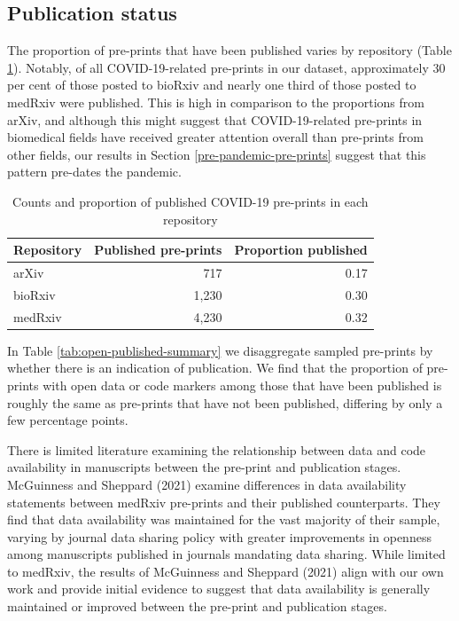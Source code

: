 \documentclass[
]{article}
\begin{document}
\hypertarget{publication-status}{%
\subsection{Publication status}\label{publication-status}}

The proportion of pre-prints that have been published varies by repository (Table \ref{tab:published-sample-summary}). Notably, of all COVID-19-related pre-prints in our dataset, approximately 30 per cent of those posted to bioRxiv and nearly one third of those posted to medRxiv were published. This is high in comparison to the proportions from arXiv, and although this might suggest that COVID-19-related pre-prints in biomedical fields have received greater attention overall than pre-prints from other fields, our results in Section \ref{pre-pandemic-pre-prints} suggest that this pattern pre-dates the pandemic.

\begin{table}

\caption{\label{tab:published-sample-summary}Counts and proportion of published COVID-19 pre-prints in each repository}
\centering
\begin{tabular}[t]{l|r|r}
\hline
Repository & Published pre-prints & Proportion published\\
\hline
arXiv & 717 & 0.17\\
\hline
bioRxiv & 1,230 & 0.30\\
\hline
medRxiv & 4,230 & 0.32\\
\hline
\end{tabular}
\end{table}

In Table \ref{tab:open-published-summary} we disaggregate sampled pre-prints by whether there is an indication of publication. We find that the proportion of pre-prints with open data or code markers among those that have been published is roughly the same as pre-prints that have not been published, differing by only a few percentage points.

There is limited literature examining the relationship between data and code availability in manuscripts between the pre-print and publication stages. McGuinness and Sheppard (2021) examine differences in data availability statements between medRxiv pre-prints and their published counterparts. They find that data availability was maintained for the vast majority of their sample, varying by journal data sharing policy with greater improvements in openness among manuscripts published in journals mandating data sharing. While limited to medRxiv, the results of McGuinness and Sheppard (2021) align with our own work and provide initial evidence to suggest that data availability is generally maintained or improved between the pre-print and publication stages.
\end{document}
